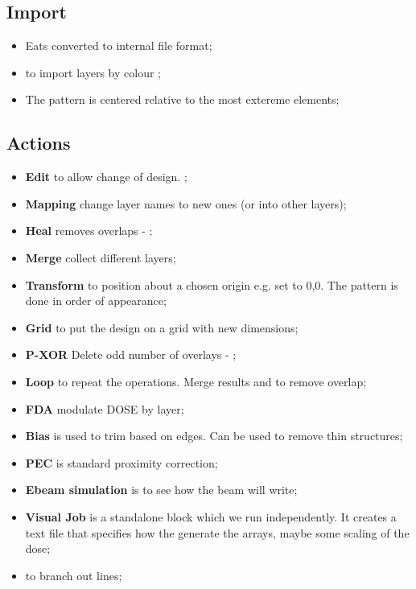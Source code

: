 \subsection{Import}
\begin{itemize}
\item Eats  \ira converted to internal file format;
\item {} to  import layers  by colour
  \hfill {};
\item The pattern is centered relative to the most extereme elements;
\end{itemize}

\subsection{Actions}
\begin{itemize}
\item \textbf{Edit}  to allow change of  design.  ;
\item \textbf{Mapping} change layer names  to new ones (or into other
  layers);
\item  \textbf{Heal} removes  overlaps -  ;
\item \textbf{Merge} collect different layers;
\item \textbf{Transform} to  position about a chosen  origin e.g. set
   to 0,0. The pattern is done in order of appearance;
\item \textbf{Grid} to put the design on a grid with new dimensions;
\item \textbf{P-XOR} Delete odd number of overlays - ;
\item  \textbf{Loop} to  repeat  the operations.   Merge results  and
   to remove overlap;
\item \textbf{FDA} modulate DOSE by layer;
\item \textbf{Bias}  is used to trim  based on edges. Can  be used to
  remove thin structures;
\item \textbf{PEC} is standard proximity correction;
\item \textbf{Ebeam simulation} is to see how the beam will write;
\item  \textbf{Visual  Job}  is  a  standalone  block  which  we  run
  independently.   It creates  a  text file  that  specifies how  the
  generate the arrays, maybe some scaling of the dose;
\item {} to branch out lines;


\end{itemize}
